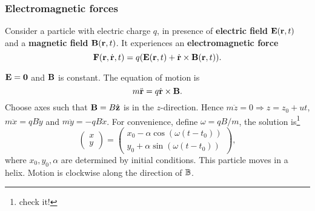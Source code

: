 \subsubsection{Electromagnetic forces}
\begin{law}
    Consider a particle with electric charge $q$, in presence of \textbf{electric field} $ {\bf E}({\bf r},t) $ and a \textbf{magnetic field} $ {\bf B}({\bf r},t) $. It experiences an \textbf{electromagnetic force}
    \[
        {\bf F}({\bf r},\dot{{\bf r}},t) = q({\bf E}({\bf r},t)+\dot{{\bf r}}\times {\bf B}({\bf r},t)).
    \]
\end{law}
\begin{example}
    $ {\bf E} = \mathbf{0} $ and $ {\bf B} $ is constant. The equation of motion is 
    \[
        m \ddot{{\bf r}} = q \dot{{\bf r}} \times {\bf B}.
    \]
    Choose axes such that ${\bf B} = B \hat{{\bf z}}$ is in the $z$-direction. Hence $m\ddot{z}=0 \Rightarrow z=z_0+ut$, $ m \ddot{x}=qB \dot{y} $ and $ m \ddot{y}=-qB \dot{x} $. For convenience, define $ \omega = qB/m $, the solution is\footnote{check it!}
    \[
        \begin{pmatrix}
            x \\ y
        \end{pmatrix}=
        \begin{pmatrix}
            x_0-\alpha \cos (\omega(t-t_0)) \\ y_0+\alpha \sin (\omega(t-t_0))
        \end{pmatrix},
    \] 
    where $x_0,y_0,\alpha$ are determined by initial conditions. This particle moves in a helix. Motion is clockwise along the direction of $ {\mathbb{B}} $.
    \begin{center}
    \end{center}
\end{example}